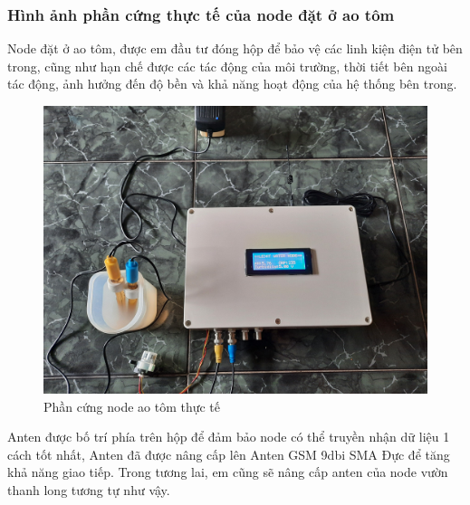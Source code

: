 \subsubsection{Hình ảnh phần cứng thực tế của node đặt ở ao tôm}
\indent Node đặt ở ao tôm, được em đầu tư đóng hộp để bảo vệ các linh kiện điện tử bên trong, cũng như hạn chế được các tác động của môi trường, thời tiết bên ngoài tác động, ảnh hưởng đến độ bền và khả năng hoạt động của hệ thống bên trong.
\begin{figure}[H]
	\centering
	\includegraphics[scale=0.1]{Chapter 4/image chapter 4/aotomNode.jpg}
	\caption[Phần cứng node ao tôm thực tế]{Phần cứng node ao tôm thực tế}
\end{figure}
\indent Anten được bố trí phía trên hộp để đảm bảo node có thể truyền nhận dữ liệu 1 cách tốt nhất, Anten đã được nâng cấp lên Anten GSM 9dbi SMA Đực để tăng khả năng giao tiếp. Trong tương lai, em cũng sẽ nâng cấp anten của node vườn thanh long tương tự như vậy.
